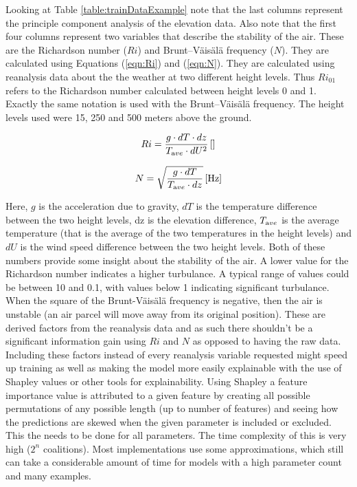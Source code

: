 Looking at Table \ref{table:trainDataExample} note that the last \nPCA columns represent the principle component analysis of the elevation data. Also note that the first four columns represent two variables that describe the stability of the air. These are the Richardson number ($Ri$)\cite{richardson_number_skybrary} and Brunt–Väisälä frequency\cite{brunt_vaisala_freq_eumtrain} ($N$). They are calculated using Equations (\ref{eqn:Ri}) and (\ref{eqn:N})\cite{mean_gust_HA_HO}. They are calculated using reanalysis data about the the weather at two different height levels. Thus $Ri_{01}$ refers to the Richardson number calculated between height levels 0 and 1. Exactly the same notation is used with the Brunt–Väisälä frequency. The height levels used were 15, 250 and 500 meters above the ground.

\begin{equation}
    \label{eqn:Ri}
    Ri = \frac{g \cdot dT \cdot dz}{T_{\textrm ave} \cdot dU^2} \, \mathrm{[]}
\end{equation}

\begin{equation}
    \label{eqn:N}
    N = \sqrt{\frac{g \cdot dT }{T_{\textrm ave} \cdot dz}} \, \mathrm{[Hz]}
\end{equation}

Here, $g$ is the acceleration due to gravity, $dT$ is the temperature difference between the two height levels, dz is the elevation difference, $T_{\textrm ave}$ is the average temperature (that is the average of the two temperatures in the height levels) and $dU$ is the wind speed difference between the two height levels. Both of these numbers provide some insight about the stability of the air. A lower value for the Richardson number indicates a higher turbulance. A typical range of values could be between 10 and 0.1, with values below 1 indicating significant turbulance\cite{richardson_number_skybrary}. When the square of the Brunt-Väisälä frequency is negative, then the air is unstable (an air parcel will move away from its original position)\cite{brunt_vaisala_freq_eumtrain}. These are derived factors from the reanalysis data and as such there shouldn't be a significant information gain using $Ri$ and $N$ as opposed to having the raw data. Including these factors instead of every reanalysis variable requested might speed up training as well as making the model more easily explainable with the use of Shapley values or other tools for explainability. Using Shapley a feature importance value is attributed to a given feature by creating all possible permutations of any possible length (up to number of features) and seeing how the predictions are skewed when the given parameter is included or excluded. This the needs to be done for all parameters. The time complexity of this is very high ($2^n$ coalitions)\cite{shapley_information}. Most implementations use some approximations, which still can take a considerable amount of time for models with a high parameter count and many examples.

